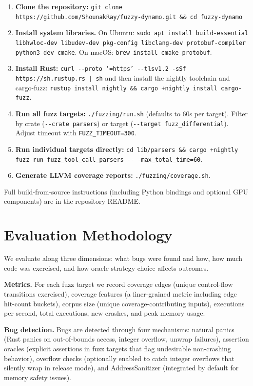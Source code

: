 \documentclass[11pt]{article}
\begin{document}
\begin{enumerate}[nosep]
    \item \textbf{Clone the repository:} \texttt{git clone https://github.com/ShounakRay/fuzzy-dynamo.git \&\& cd fuzzy-dynamo}
    \item \textbf{Install system libraries.} On Ubuntu: \texttt{sudo apt install build-essential libhwloc-dev libudev-dev pkg-config libclang-dev protobuf-compiler python3-dev cmake}. On macOS: \texttt{brew install cmake protobuf}.
    \item \textbf{Install Rust:} \texttt{curl -{}-proto '=https' -{}-tlsv1.2 -sSf https://sh.rustup.rs | sh} and then install the nightly toolchain and cargo-fuzz: \texttt{rustup install nightly \&\& cargo +nightly install cargo-fuzz}.
    \item \textbf{Run all fuzz targets:} \texttt{./fuzzing/run.sh} (defaults to 60s per target). Filter by crate (\texttt{-{}-crate parsers}) or target (\texttt{-{}-target fuzz\_differential}). Adjust timeout with \texttt{FUZZ\_TIMEOUT=300}.
    \item \textbf{Run individual targets directly:} \texttt{cd lib/parsers \&\& cargo +nightly fuzz run fuzz\_tool\_call\_parsers -{}-  -max\_total\_time=60}.
    \item \textbf{Generate LLVM coverage reports:} \texttt{./fuzzing/coverage.sh}.
\end{enumerate}

Full build-from-source instructions (including Python bindings and optional GPU components) are in the repository README.

\section{Evaluation Methodology}

We evaluate along three dimensions: what bugs were found and how, how much code was exercised, and how oracle strategy choice affects outcomes.

\textbf{Metrics.} For each fuzz target we record coverage edges (unique control-flow transitions exercised), coverage features (a finer-grained metric including edge hit-count buckets), corpus size (unique coverage-contributing inputs), executions per second, total executions, new crashes, and peak memory usage.

\textbf{Bug detection.} Bugs are detected through four mechanisms: natural panics (Rust panics on out-of-bounds access, integer overflow, unwrap failures), assertion oracles (explicit assertions in fuzz targets that flag undesirable non-crashing behavior), overflow checks (optionally enabled to catch integer overflows that silently wrap in release mode), and AddressSanitizer (integrated by default for memory safety issues).
\end{document}
